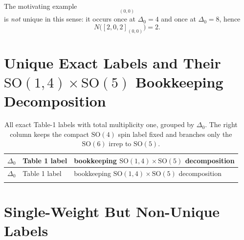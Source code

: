 \documentclass[12pt]{article}
\newcommand{\SO}{\mathrm{SO}}
\newcommand{\D}{\Delta}
\begin{document}
The motivating example
\begin{equation}
[2,0,2]_{(0,0)}
\end{equation}
is \emph{not} unique in this sense: it occurs once at $\D_0=4$ and once at $\D_0=8$, hence
\begin{equation}
N\big([2,0,2]_{(0,0)}\big)=2.
\end{equation}

\section{Unique Exact Labels and Their \texorpdfstring{$\SO(1,4)\times \SO(5)$}{SO(1,4)xSO(5)} Bookkeeping Decomposition}

\small
\begin{longtable}{c p{} >{\raggedright\arraybackslash}p{}}
\caption{All exact Table-1 labels with total multiplicity one, grouped by $\D_0$. The right column keeps the compact $\SO(4)$ spin label fixed and branches only the $\SO(6)$ irrep to $\SO(5)$.}
\label{tab:unique-exact-labels}\\
\toprule
$\D_0$ & Table 1 label & bookkeeping $\SO(1,4)\times \SO(5)$ decomposition \\
\midrule
\endfirsthead
\toprule
$\D_0$ & Table 1 label & bookkeeping $\SO(1,4)\times \SO(5)$ decomposition \\
\midrule
\endhead
\midrule
\endfoot
\bottomrule
\endlastfoot

\end{longtable}
\normalsize

\section{Single-Weight But Non-Unique Labels}
\end{document}
